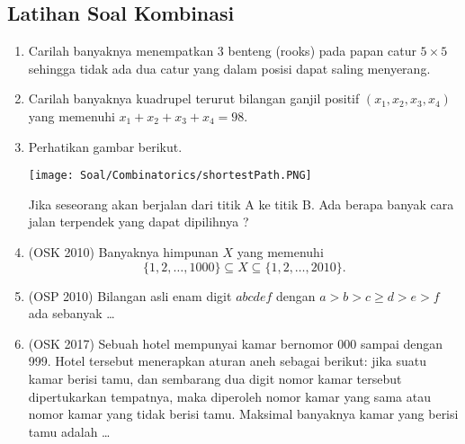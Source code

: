\subsection{Latihan Soal Kombinasi}
\begin{enumerate}   
    \item  Carilah banyaknya menempatkan 3 benteng (rooks) pada papan catur $5 \times 5$ sehingga tidak ada dua catur yang dalam posisi dapat saling menyerang.

    \item Carilah banyaknya kuadrupel terurut bilangan ganjil positif $(x_1, x_2, x_3, x_4)$ yang memenuhi $x_1 + x_2 + x_3 + x_4 = 98$.

    \item Perhatikan gambar berikut. 
    
    \texttt{[image: Soal/Combinatorics/shortestPath.PNG]} 
    
    Jika seseorang akan berjalan dari titik A ke titik B. Ada berapa banyak cara jalan terpendek yang dapat dipilihnya ?

    \item (OSK 2010) Banyaknya himpunan $X$ yang memenuhi 
    $$\{1,2,\dots,1000\} \subseteq X \subseteq \{1,2,\dots,2010\}.$$

    \item (OSP 2010) Bilangan asli enam digit $abcdef$ dengan $a > b > c \ge d > e > f$ ada sebanyak \dots
    
    \item (OSK 2017)
	Sebuah hotel mempunyai kamar bernomor 000 sampai dengan 999. Hotel tersebut menerapkan aturan aneh sebagai berikut: jika suatu kamar berisi tamu, dan sembarang dua digit nomor kamar tersebut dipertukarkan tempatnya, maka diperoleh nomor kamar yang sama atau nomor kamar yang tidak berisi tamu. Maksimal banyaknya kamar yang berisi tamu adalah \dots
\end{enumerate}